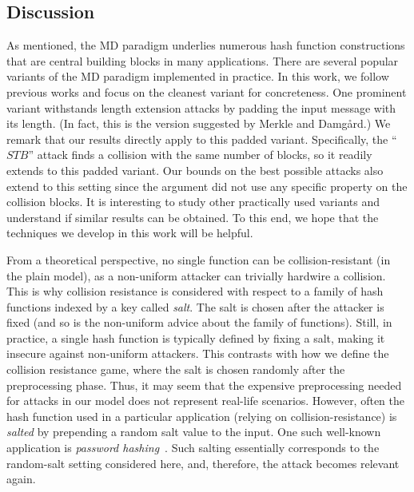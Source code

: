 
\subsection{Discussion}
As mentioned, the MD paradigm underlies numerous hash function constructions that are central building blocks in many applications. There are several popular variants of the MD paradigm implemented in practice. In this work, we follow previous works and focus on the cleanest variant for concreteness. One prominent variant withstands length extension attacks by padding the input message with its length. (In fact, this is the version suggested by Merkle and Damg{\aa}rd.)  We remark that our results directly apply to this padded variant.
Specifically, the ``$STB$'' attack finds a collision with the same number of blocks, so it readily extends to this padded variant. Our bounds on the best possible attacks also extend to this setting since the argument did not use any specific property on the collision blocks. 
It is interesting to study other practically used variants and understand if similar results can be obtained. To this end, we hope that the techniques we develop in this work will be helpful.

From a theoretical perspective, no single function can be collision-resistant (in the plain model), as a non-uniform attacker can trivially hardwire a collision. This is why collision resistance is considered with respect to a family of hash functions indexed by a key called \emph{salt}. The salt is chosen after the attacker is fixed (and so is the non-uniform advice about the family of functions). Still, in practice, a single hash function is typically defined by fixing a salt, making it insecure against non-uniform attackers. This contrasts with how we define the collision resistance game, where the salt is chosen randomly after the preprocessing phase. Thus, it may seem that the expensive preprocessing needed for attacks in our model does not represent real-life scenarios. However, often the hash function used in a particular application (relying on collision-resistance) is  \emph{salted} by prepending a random salt value to the input. One such well-known application is \emph{password hashing}~\cite{MorrisT79}. Such salting essentially corresponds to the random-salt setting considered here, and, therefore, the attack becomes relevant again. 

